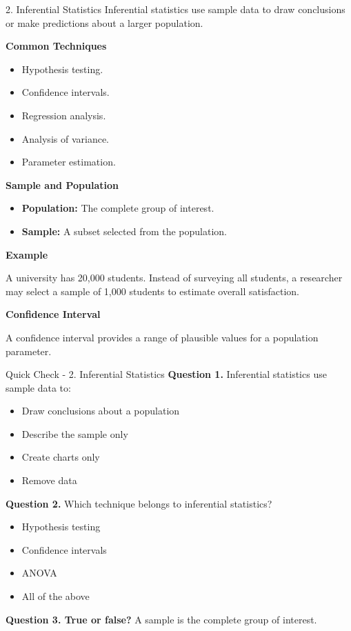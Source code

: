 \documentclass[aspectratio=169,11pt]{beamer}
\begin{document}
\begin{frame}[allowframebreaks]{2. Inferential Statistics}
\footnotesize
Inferential statistics use sample data to draw conclusions or make predictions about a larger population.\par\medskip
\textbf{Common Techniques}\par\medskip
\begin{itemize}
\item Hypothesis testing.
\item Confidence intervals.
\item Regression analysis.
\item Analysis of variance.
\item Parameter estimation.
\end{itemize}
\textbf{Sample and Population}\par\medskip
\begin{itemize}
\item \textbf{Population:} The complete group of interest.
\item \textbf{Sample:} A subset selected from the population.
\end{itemize}
\textbf{Example}\par\medskip
A university has 20,000 students. Instead of surveying all students, a researcher may select a sample of 1,000 students to estimate overall satisfaction.\par\medskip
\textbf{Confidence Interval}\par\medskip
A confidence interval provides a range of plausible values for a population parameter.\par\medskip
\end{frame}
\begin{frame}[allowframebreaks]{Quick Check - 2. Inferential Statistics}
\footnotesize
\textbf{Question 1.} Inferential statistics use sample data to:\par\medskip
\begin{itemize}
\item[\textbf{A.}] Draw conclusions about a population
\item[\textbf{B.}] Describe the sample only
\item[\textbf{C.}] Create charts only
\item[\textbf{D.}] Remove data
\end{itemize}
\textbf{Question 2.} Which technique belongs to inferential statistics?\par\medskip
\begin{itemize}
\item[\textbf{A.}] Hypothesis testing
\item[\textbf{B.}] Confidence intervals
\item[\textbf{C.}] ANOVA
\item[\textbf{D.}] All of the above
\end{itemize}
\textbf{Question 3. True or false?} A sample is the complete group of interest.\par\medskip
\end{frame}
\end{document}
